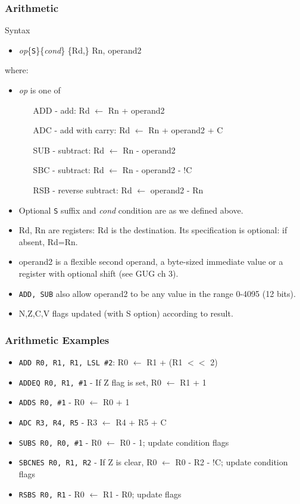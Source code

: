 \documentclass[10pt]{beamer}
\begin{document}
\begin{frame}
\frametitle{Arithmetic}
Syntax
\begin{itemize}
\item \textit{op}\{\texttt{S}\}\{\textit{cond}\} \{Rd,\} Rn, operand2
\end{itemize}

where:
\begin{itemize}
\item \textit{op} is one of
  \begin{itemize}
  \item[ADD] - add: Rd $\leftarrow$ Rn + operand2
  \item[ADC] - add with carry: Rd $\leftarrow$ Rn + operand2 + C
  \item[SUB] - subtract: Rd $\leftarrow$ Rn - operand2
  \item[SBC] - subtract: Rd $\leftarrow$ Rn - operand2 - !C
  \item[RSB] - reverse subtract: Rd $\leftarrow$ operand2 - Rn
  \end{itemize}
\item Optional \texttt{S} suffix and \textit{cond} condition are as we defined above.
\item Rd, Rn are registers: Rd is the destination. Its specification is optional: if absent, Rd=Rn.
\item operand2 is a flexible second operand, a byte-sized immediate value or a register with optional shift (see GUG ch 3).
\item \texttt{ADD, SUB} also allow operand2 to be any value in the range 0-4095 (12 bits).
\item N,Z,C,V flags updated (with S option) according to result.
\end{itemize}
\end{frame}

\begin{frame}
\frametitle{Arithmetic Examples}
\begin{itemize}
\item \texttt{\color{brown}ADD R0, R1, R1, LSL \#2}: R0 $\leftarrow$ R1 + (R1 $<<$ 2)
\item \texttt{\color{brown}ADDEQ R0, R1, \#1} - If Z flag is set, R0 $\leftarrow$ R1 + 1
\item \texttt{\color{brown}ADDS R0, \#1} - R0 $\leftarrow$ R0 + 1
\item \texttt{\color{brown}ADC R3, R4, R5} - R3 $\leftarrow$ R4 + R5 + C
\item \texttt{\color{brown}SUBS R0, R0, \#1} - R0 $\leftarrow$ R0 - 1; update condition flags
\item \texttt{\color{brown}SBCNES R0, R1, R2} - If Z is clear, R0 $\leftarrow$ R0 - R2 - !C; update condition flags
\item \texttt{\color{brown}RSBS R0, R1} - R0 $\leftarrow$ R1 - R0; update flags
\end{itemize}
\end{frame}
\end{document}
